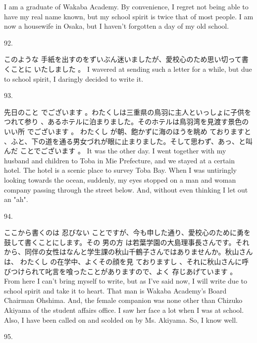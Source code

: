 \par{I am a graduate of Wakaba Academy. By convenience, I regret not being able to have my real name known, but my school spirit is twice that of most people. I am now a housewife in Osaka, but I haven't forgotten a day of my old school. }

\par{92. }

\par{このような 手紙を出すのをずいぶん迷いましたが、愛校心のため思い切って書くことに いたしました 。 \hfill\break
I wavered at sending such a letter for a while, but due to school spirit, I daringly decided to write it. }

\par{93. }

\par{先日のこと でございます 。わたくしは三重県の鳥羽に主人といっしょに子供を つれて参り 、あるホテルに泊まりました。そのホテルは鳥羽湾を見渡す景色のいい所 でございます 。 わたくし が朝、飽かずに海のほうを眺め ておりますと 、ふと、下の道を通る男女づれが眼に止まりました。そして思わず、あっ、と叫んだ ことでございます 。 \hfill\break
It was the other day. I went together with my husband and children to Toba in Mie Prefecture, and we stayed at a certain hotel. The hotel is a scenic place to survey Toba Bay. When I was untiringly looking towards the ocean, suddenly, my eyes stopped on a man and woman company passing through the street below. And, without even thinking I let out an "ah". }

\par{94. }

\par{ここから書くのは 忍びない ことですが、今も申した通り、愛校心のために勇を鼓して書くことにします。その 男の方 は若葉学園の大島理事長さんです。それから、同伴の女性はなんと学生課の秋山千鶴子さんではありませんか。秋山さんは、 わたくし の在学中、よくその顔を見 ておりますし 、それに秋山さんに呼びつけられて叱言を喰ったことがありますので、よく 存じあげています 。 \hfill\break
From here I can't bring myself to write, but as I've said now, I will write due to school spirit and take it to heart. That man is Wakaba Academy's Board Chairman Ohshima. And, the female companion was none other than Chizuko Akiyama of the student affairs office. I saw her face a lot when I was at school. Also, I have been called on and scolded on by Ms. Akiyama. So, I know well. }

\par{95. }

